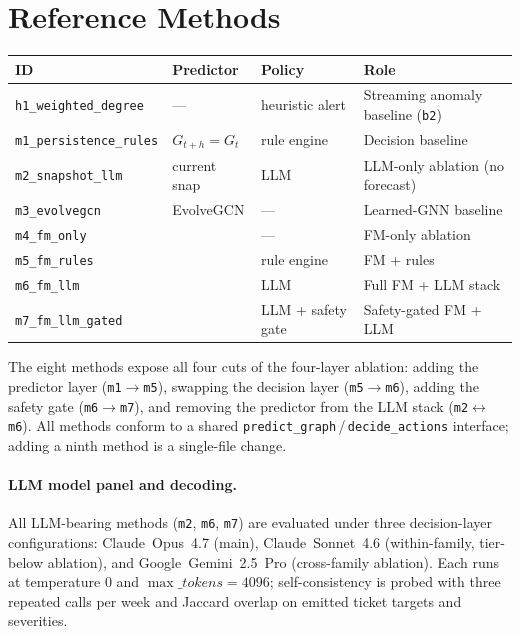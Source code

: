 \section{Reference Methods}
\label{app:reference-methods}

\begin{center}\small
\begin{tabularx}{\linewidth}{@{}lllX@{}}
\toprule
ID                              & Predictor      & Policy                & Role \\
\midrule
\texttt{h1\_weighted\_degree}   & ---            & heuristic alert       & Streaming anomaly baseline (\texttt{b2}) \\
\texttt{m1\_persistence\_rules} & $G_{t+h}\!=\!G_t$ & rule engine        & Decision baseline \\
\texttt{m2\_snapshot\_llm}      & current snap   & LLM                   & LLM-only ablation (no forecast) \\
\texttt{m3\_evolvegcn}          & EvolveGCN      & ---                   & Learned-GNN baseline \\
\texttt{m4\_fm\_only}           & \fmname{}      & ---                   & FM-only ablation \\
\texttt{m5\_fm\_rules}          & \fmname{}      & rule engine           & FM + rules \\
\texttt{m6\_fm\_llm}            & \fmname{}      & LLM                   & Full FM + LLM stack \\
\texttt{m7\_fm\_llm\_gated}     & \fmname{}      & LLM + safety gate     & Safety-gated FM + LLM \\
\bottomrule
\end{tabularx}
\end{center}

The eight methods expose all four cuts of the four-layer ablation:
adding the predictor layer
(\texttt{m1}$\!\to\!$\texttt{m5}), swapping the decision layer
(\texttt{m5}$\!\to\!$\texttt{m6}), adding the safety gate
(\texttt{m6}$\!\to\!$\texttt{m7}), and removing the predictor from
the LLM stack (\texttt{m2}$\!\leftrightarrow\!$\texttt{m6}). All
methods conform to a shared
\texttt{predict\_graph}\,/\,\texttt{decide\_actions} interface;
adding a ninth method is a single-file change.

\paragraph{LLM model panel and decoding.}
All LLM-bearing methods (\texttt{m2}, \texttt{m6}, \texttt{m7}) are
evaluated under three decision-layer configurations:
Claude~Opus~4.7 (main), Claude~Sonnet~4.6 (within-family,
tier-below ablation), and Google~Gemini~2.5~Pro (cross-family
ablation). Each runs at temperature $0$ and $\max\_tokens=4096$;
self-consistency is probed with three repeated calls per week and
Jaccard overlap on emitted ticket targets and severities.

